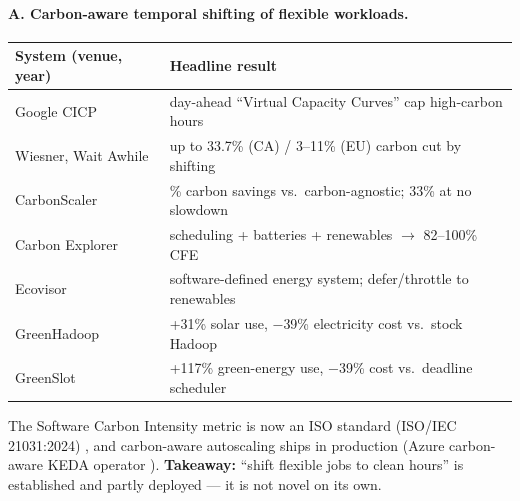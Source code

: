 \documentclass{article}
\begin{document}
\paragraph{A. Carbon-aware temporal shifting of flexible workloads.}
\begin{center}
\begin{tabular}{>{\raggedright\arraybackslash}p{4.6cm}>{\raggedright\arraybackslash}p{8.4cm}}
\hline
\textbf{System (venue, year)} & \textbf{Headline result} \\
\hline
Google CICP \cite{r11} & day-ahead ``Virtual Capacity Curves'' cap high-carbon hours \\
Wiesner, Wait Awhile \cite{r12} & up to 33.7\% (CA) / 3--11\% (EU) carbon cut by shifting \\
CarbonScaler \cite{r13} & 51\% carbon savings vs.\ carbon-agnostic; 33\% at no slowdown \\
Carbon Explorer \cite{r14} & scheduling + batteries + renewables $\to$ 82--100\% CFE \\
Ecovisor \cite{r15} & software-defined energy system; defer/throttle to renewables \\
GreenHadoop \cite{r16} & +31\% solar use, $-$39\% electricity cost vs.\ stock Hadoop \\
GreenSlot \cite{r17} & +117\% green-energy use, $-$39\% cost vs.\ deadline scheduler \\
\hline
\end{tabular}
\end{center}
The Software Carbon Intensity metric is now an ISO standard (ISO/IEC 21031:2024)
\cite{r18}, and carbon-aware autoscaling ships in production (Azure carbon-aware KEDA
operator \cite{r19}). \textbf{Takeaway:} ``shift flexible jobs to clean hours'' is
established and partly deployed --- it is not novel on its own.
\end{document}
